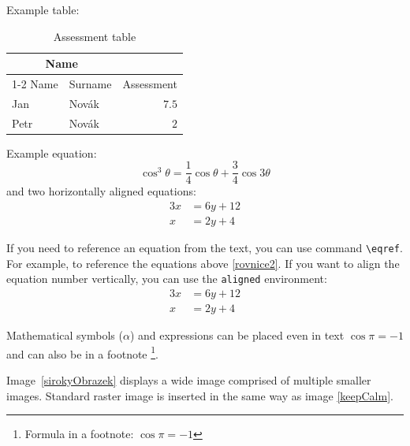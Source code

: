 
Example table:
\begin{table}[H]
	\vskip6pt
	\caption{Assessment table}
    \vskip6pt
	\centering
	\begin{tabular}{llr}
		\toprule
		\multicolumn{2}{c}{Name} \\
		\cmidrule(r){1-2}
		Name & Surname & Assessment \\
		\midrule
		Jan & Novák & $7.5$ \\
		Petr & Novák & $2$ \\
		\bottomrule
	\end{tabular}
	\label{tab:ExampleTable}
\end{table}


\noindent Example equation:
\begin{equation}
\cos^3 \theta =\frac{1}{4}\cos\theta+\frac{3}{4}\cos 3\theta
\label{rovnice2}
\end{equation}
and two horizontally aligned equations: %
\begin{align} \label{eq:soustava}
	3x &= 6y + 12 \\
	x &= 2y + 4 
\end{align}

If you need to reference an equation from the text, you can use command \verb|\eqref|. For example, to reference the equations above \eqref{rovnice2}. If you want to align the equation number vertically, you can use the \texttt{aligned} environment:
\begin{equation} \label{eq:soustavaSrovnana}
\begin{aligned}
	3x &= 6y + 12 \\
	x &= 2y + 4
\end{aligned}
\end{equation}

Mathematical symbols ($\alpha$) and expressions can be placed even in text $\cos\pi=-1$ and can also be in a footnote%
\footnote{Formula in a footnote: $\cos\pi=-1$}.

Image~\ref{sirokyObrazek} displays a wide image comprised of multiple smaller images. Standard raster image is inserted in the same way as image \ref{keepCalm}.

